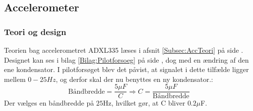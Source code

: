 \subsection{Accelerometer}\label{Acc_afsnit}
\subsubsection{Teori og design}
Teorien bag accelerometret ADXL335 læses i afsnit \ref{Subsec:AccTeori} på side \pageref{Subsec:AccTeori}. Designet kan ses i bilag \ref{Bilag:Pilotforsoeg} på side \pageref{Bilag:Pilotforsoeg}, dog med en ændring af den ene kondensator. I pilotforsøget blev det påvist, at signalet i dette tilfælde ligger mellem $0-25Hz$, og derfor skal der nu benyttes en ny kondensator.\cite{Devices2009}:
\begin{equation}
\text{Båndbredde} = \dfrac{5\mu F}{C} \Rightarrow  C = \dfrac{5\mu F}{\text{Båndbredde}}
\end{equation}
Der vælges en båndbredde på $25$Hz, hvilket gør, at C bliver $0.2\mu$F.  

